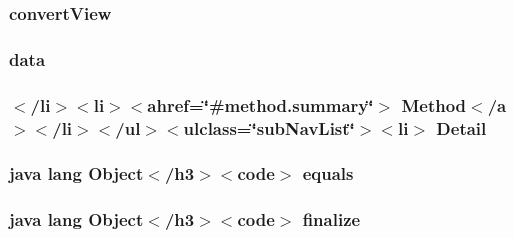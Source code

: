 \hypertarget{_show_all_list_adapter_8html_a074c9ae2abe97703c9c031be7f3eb2e5}{
\subsubsection[{convert\-View}]{\setlength{\rightskip}{0pt plus 5cm}convert\-View}}\label{_show_all_list_adapter_8html_a074c9ae2abe97703c9c031be7f3eb2e5}
\hypertarget{_show_all_list_adapter_8html_a511ae0b1c13f95e5f08f1a0dd3da3d93}{
\subsubsection[{data}]{\setlength{\rightskip}{0pt plus 5cm}data}}\label{_show_all_list_adapter_8html_a511ae0b1c13f95e5f08f1a0dd3da3d93}
\hypertarget{_show_all_list_adapter_8html_a1e04b5ec07bcd5281e26dcd40e5b3a94}{
\subsubsection[{Detail}]{\setlength{\rightskip}{0pt plus 5cm}$<$/li$>$$<$li$>$$<$ahref=\char`\"{}\#method.\-summary\char`\"{}$>$ Method$<$/{\bf a}$>$$<$/li$>$$<$/ul$>$$<$ulclass=\char`\"{}sub\-Nav\-List\char`\"{}$>$$<$li$>$ Detail}}\label{_show_all_list_adapter_8html_a1e04b5ec07bcd5281e26dcd40e5b3a94}
\hypertarget{_show_all_list_adapter_8html_a8974318cea585f72df717e0380ec7104}{
\subsubsection[{equals}]{\setlength{\rightskip}{0pt plus 5cm}java lang Object$<$/h3$>$$<$code$>$ equals}}\label{_show_all_list_adapter_8html_a8974318cea585f72df717e0380ec7104}
\hypertarget{_show_all_list_adapter_8html_ab2315181ead4aeedef2374039b6ddde7}{
\subsubsection[{finalize}]{\setlength{\rightskip}{0pt plus 5cm}java lang Object$<$/h3$>$$<$code$>$ finalize}}\label{_show_all_list_adapter_8html_ab2315181ead4aeedef2374039b6ddde7}
